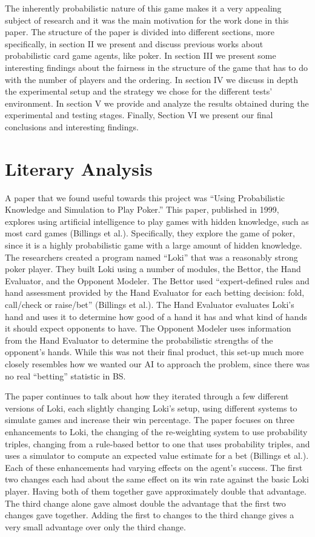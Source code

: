 \documentclass[a4paper,12pt]{article}
\begin{document}
The inherently probabilistic nature of this game makes it a very appealing subject of research and it was the main motivation for the work done in this paper. The structure of the paper is divided into different sections, more specifically,  in section II we present and discuss previous works about probabilistic card game agents, like poker. In section III we present some interesting findings about the fairness in the structure of the game that has to do with the number of players and the ordering. In section IV we discuss in depth the experimental setup and the strategy we chose for the different tests’ environment. In section V we provide and analyze the results obtained during the experimental and testing stages. Finally, Section VI we present our final conclusions and interesting findings. 


\section{Literary Analysis}

A paper that we found useful towards this project was “Using Probabilistic Knowledge and Simulation to Play Poker.” This paper, published in 1999, explores using artificial intelligence to play games with hidden knowledge, such as most card games (Billings et al.). Specifically, they explore the game of poker, since it is a highly probabilistic game with a large amount of hidden knowledge. The researchers created a program named “Loki” that was a reasonably strong poker player. They built Loki using a number of modules, the Bettor, the Hand Evaluator, and the Opponent Modeler. The Bettor used “expert-defined rules and hand assessment provided by the Hand Evaluator for each betting decision: fold, call/check or raise/bet” (Billings et al.).  The Hand Evaluator evaluates Loki’s hand and uses it to determine how good of a hand it has and what kind of hands it should expect opponents to have. The Opponent Modeler uses information from the Hand Evaluator to determine the probabilistic strengths of the opponent’s hands. While this was not their final product, this set-up much more closely resembles how we wanted our AI to approach the problem, since there was no real “betting” statistic in BS.

	The paper continues to talk about how they iterated through a few different versions of Loki, each slightly changing Loki’s setup, using different systems to simulate games and increase their win percentage. The paper focuses on three enhancements to Loki, the changing of the re-weighting system to use probability triples, changing from a rule-based bettor to one that uses probability triples, and uses a simulator to compute an expected value estimate for a bet (Billings et al.). Each of these enhancements had varying effects on the agent’s success. The first two changes each had about the same effect on its win rate against the basic Loki player. Having both of them together gave approximately double that advantage. The third change alone gave almost double the advantage that the first two changes gave together. Adding the first to changes to the third change gives a very small advantage over only the third change. 
\end{document}
